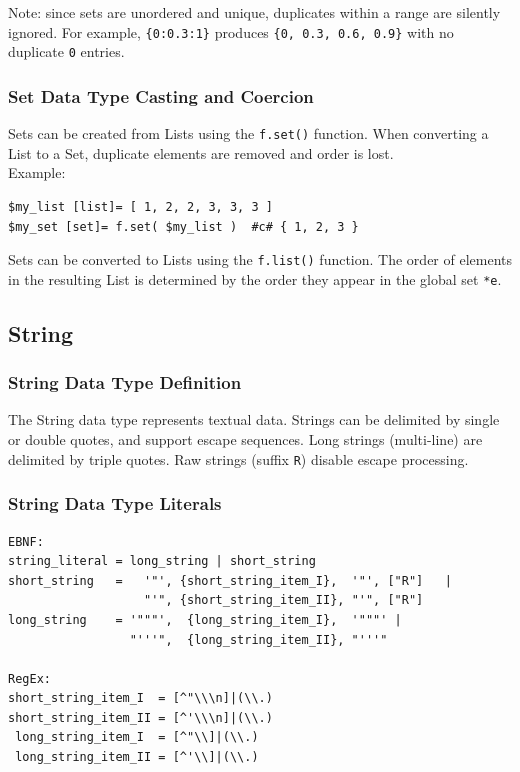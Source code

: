 Note: since sets are unordered and unique, duplicates within a range are silently ignored. For example, \texttt{\{0:0.3:1\}} produces \texttt{\{0, 0.3, 0.6, 0.9\}} with no duplicate \texttt{0} entries.

\subsubsection{Set Data Type Casting and Coercion}
Sets can be created from Lists using the \texttt{f.set()} function. When converting a List to a Set, duplicate elements are removed and order is lost.\\
Example:
\begin{verbatim}
$my_list [list]= [ 1, 2, 2, 3, 3, 3 ]
$my_set [set]= f.set( $my_list )  #c# { 1, 2, 3 }
\end{verbatim}
Sets can be converted to Lists using the \texttt{f.list()} function. The order of elements in the resulting List is determined by the order they appear in the global set \texttt{*e}.
\subsection{String}
\subsubsection{String Data Type Definition}
The String data type represents textual data. Strings can be delimited by single or double quotes, and support escape sequences. Long strings (multi-line) are delimited by triple quotes. Raw strings (suffix \texttt{R}) disable escape processing.
\subsubsection{String Data Type Literals}
\begin{verbatim}
EBNF:
string_literal = long_string | short_string
short_string   =   '"', {short_string_item_I},  '"', ["R"]   |
                   "'", {short_string_item_II}, "'", ["R"]
long_string    = '"""',  {long_string_item_I},  '"""' |
                 "'''",  {long_string_item_II}, "'''"

RegEx:
short_string_item_I  = [^"\\\n]|(\\.)
short_string_item_II = [^'\\\n]|(\\.)
 long_string_item_I  = [^"\\]|(\\.)
 long_string_item_II = [^'\\]|(\\.)
\end{verbatim}

